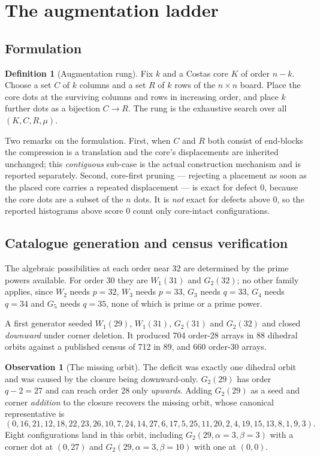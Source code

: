 \documentclass[11pt,a4paper]{article}
\theoremstyle{definition}
\newtheorem{definition}[theorem]{Definition}
\newtheorem{observation}[theorem]{Observation}
\begin{document}
\section{The augmentation ladder}
\label{sec:ladder}

\subsection{Formulation}

\begin{definition}[Augmentation rung]
Fix $k$ and a Costas core $K$ of order $n-k$. Choose a set $C$ of $k$ columns
and a set $R$ of $k$ rows of the $n\times n$ board. Place the core dots at the
surviving columns and rows in increasing order, and place $k$ further dots as a
bijection $C\to R$. The rung is the exhaustive search over all
$(K,C,R,\mu)$.
\end{definition}

Two remarks on the formulation. First, when $C$ and $R$ both consist of
end-blocks the compression is a translation and the core's displacements are
inherited unchanged; this \emph{contiguous} sub-case is the actual construction
mechanism and is reported separately. Second, core-first pruning --- rejecting a
placement as soon as the placed core carries a repeated displacement --- is
exact for defect 0, because the core dots are a subset of the $n$ dots. It is
\emph{not} exact for defects above 0, so the reported histograms above score 0
count only core-intact configurations.

\subsection{Catalogue generation and census verification}
\label{sec:catalogue}

The algebraic possibilities at each order near 32 are determined by the prime
powers available. For order 30 they are $W_1(31)$ and $G_2(32)$; no other family
applies, since $W_2$ needs $p=32$, $W_3$ needs $p=33$, $G_3$ needs $q=33$, $G_4$
needs $q=34$ and $G_5$ needs $q=35$, none of which is prime or a prime power.

A first generator seeded $W_1(29)$, $W_1(31)$, $G_2(31)$ and $G_2(32)$ and
closed \emph{downward} under corner deletion. It produced 704 order-28 arrays in
88 dihedral orbits against a published census of 712 in 89, and 660 order-30
arrays.

\begin{observation}[The missing orbit]
\label{obs:missing}
The deficit was exactly one dihedral orbit and was caused by the closure being
downward-only. $G_2(29)$ has order $q-2 = 27$ and can reach order 28 only
\emph{upwards}. Adding $G_2(29)$ as a seed and corner \emph{addition} to the
closure recovers the missing orbit, whose canonical representative is
\[
(0,16,21,12,18,22,23,26,10,7,24,14,27,6,17,5,25,11,20,2,4,19,15,13,8,1,9,3).
\]
Eight configurations land in this orbit, including $G_2(29,\alpha=3,\beta=3)$
with a corner dot at $(0,27)$ and $G_2(29,\alpha=3,\beta=10)$ with one at
$(0,0)$.
\end{observation}
\end{document}
